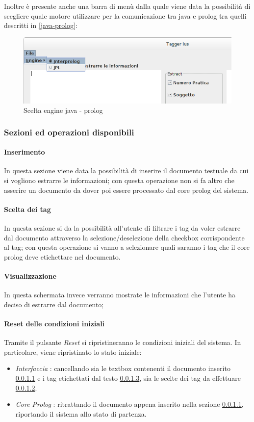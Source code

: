 Inoltre è presente anche una barra di menù dalla quale viene data la possibilità di scegliere quale motore utilizzare per la comunicazione tra java e prolog tra quelli descritti in \ref{java-prolog}:
\begin{figure}[H]
	\includegraphics[width=1\textwidth]{img/interfaces/java-engine.png}
	\caption[Schermata java engine]{Scelta engine java - prolog}
	\label{java-engine}
\end{figure}
\subsubsection{Sezioni ed operazioni disponibili}
    \paragraph{Inserimento}
    \label{Inserimento}
    In questa sezione viene data la possibilità di inserire il documento testuale da cui si vogliono estrarre le informazioni; con questa operazione non si fa altro che asserire un documento da dover poi essere processato dal core prolog del sistema.
    \paragraph{Scelta dei tag}
    \label{ChoiceTag}
    In questa sezione si da la possibilità all'utente di filtrare i tag da voler estrarre dal documento attraverso la selezione/deselezione della checkbox corrispondente al tag; con questa operazione si vanno a selezionare quali saranno i tag che il core prolog deve etichettare nel documento.
    \paragraph{Visualizzazione}
    \label{Visualization}
    In questa schermata invece verranno mostrate le informazioni che l'utente ha deciso di estrarre dal documento;
    \paragraph{Reset delle condizioni iniziali}
    Tramite il pulsante \emph{Reset} si ripristineranno le condizioni iniziali del sistema. In particolare, viene ripristinato lo stato iniziale:
    \begin{itemize}
      \item \emph{Interfaccia} : cancellando sia le textbox contenenti il documento inserito \ref{Inserimento} e i tag etichettati dal testo \ref{Visualization}, sia le scelte dei tag da effettuare \ref{ChoiceTag}.
      \item \emph{Core Prolog} : ritrattando il documento appena inserito nella sezione \ref{Inserimento}, riportando il sistema allo stato di partenza.
    \end{itemize}

